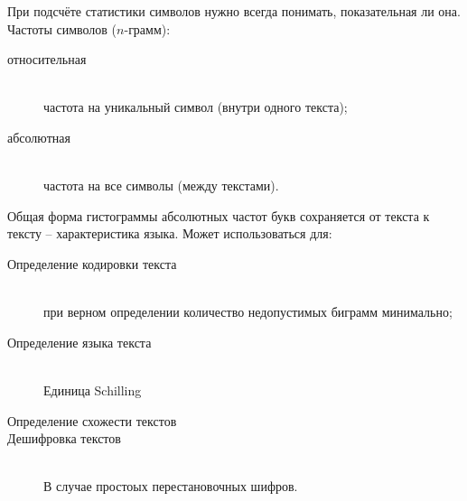 \documentclass[a4paper]{article}
\newcommand{\eng}[1]{\foreignlanguage{english}{#1}}
\begin{document}
При подсчёте статистики символов нужно всегда понимать, показательная ли она.
Частоты символов ($n$-грамм):
\begin{description}
	\item[относительная] \hfill\\
	частота на уникальный символ (внутри одного текста);
	\item[абсолютная] \hfill\\
	частота на все символы (между текстами).
\end{description}

Общая форма гистограммы абсолютных частот букв сохраняется от текста к тексту -- характеристика языка. Может использоваться для:
\begin{description}
	\item[Определение кодировки текста]\hfill\\
	при верном определении количество недопустимых биграмм минимально;
	\item[Определение языка текста] \hfill\\
	Единица \eng{Schilling}
	\item[Определение схожести текстов]
	\item[Дешифровка текстов] \hfill\\
	В случае простоых перестановочных шифров.
\end{description}


\end{document}
